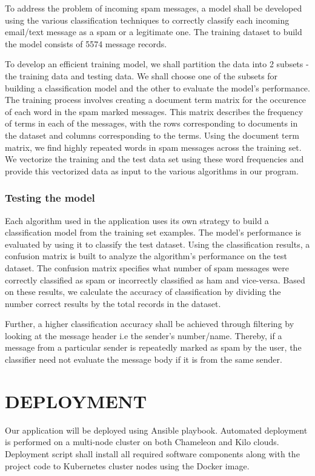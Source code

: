 \documentclass[9pt,twocolumn,twoside]{../../styles/osajnl}
\begin{document}
{To address the problem of incoming spam messages, a model shall be
developed using the various classification techniques to correctly
classify each incoming email/text message as a spam or a legitimate
one. The training dataset to build the model consists of 5574 message
records.

\noindent
To develop an efficient training model, we shall partition the data
into 2 subsets - the training data and testing data. We shall choose
one of the subsets for building a classification model and the other
to evaluate the model's performance. The training process involves
creating a document term matrix for the occurence of each word in the
spam marked messages. This matrix describes the frequency of terms in
each of the messages, with the rows corresponding to documents in the
dataset and columns corresponding to the terms. Using the document
term matrix, we find highly repeated words in spam messages across the
training set. We vectorize the training and the test data set using
these word frequencies and provide this vectorized data as input to
the various algorithms in our program.

\subsubsection{Testing the model}

Each algorithm used in the application uses its own strategy to build
a classification model from the training set examples. The model's
performance is evaluated by using it to classify the test
dataset. Using the classification results, a confusion
matrix is built to analyze the algorithm's performance on the test dataset.
The confusion matrix specifies what number of spam messages were
correctly classified as spam or incorrectly classified as ham and
vice-versa. Based on these results, we calculate the accuracy of
classification by dividing the number correct results by the total
records in the dataset.

\noindent
Further, a higher classification accuracy shall be achieved through
filtering by looking at the message header i.e the sender's
number/name. Thereby, if a message from a particular sender is
repeatedly marked as spam by the user, the classifier need not
evaluate the message body if it is from the same sender.

\section{DEPLOYMENT}
Our application will be deployed using Ansible playbook. Automated
deployment is performed on a multi-node cluster on both Chameleon and
Kilo clouds. Deployment script shall install all required software
components along with the project code to Kubernetes cluster nodes using the
Docker image.

}
\end{document}
